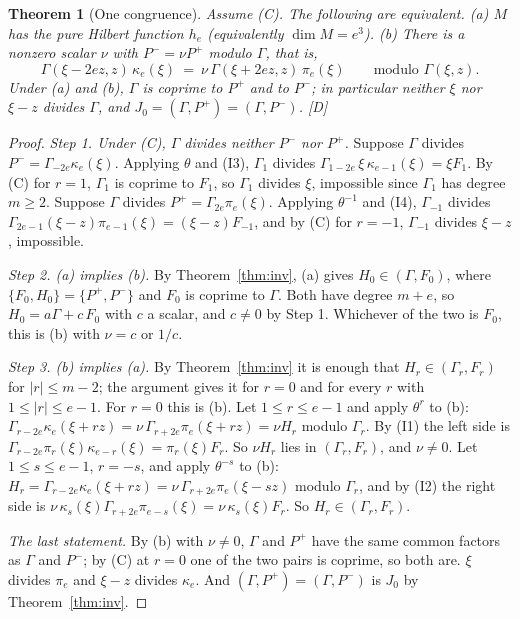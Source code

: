 \documentclass[11pt]{article}
\newtheorem{thmletter}{Theorem}
\theoremstyle{definition}
\theoremstyle{remark}
\begin{document}
\begin{thmletter}[One congruence]\label{thm:cong}
Assume (C). The following are equivalent. (a) $M$ has the pure Hilbert function $h_e$ (equivalently $\dim M=e^3$). (b) There is a nonzero scalar $\nu$ with $P^-=\nu P^+$ modulo $\Gamma$, that is,
\begin{equation}\label{eq:cong}
\Gamma(\xi-2ez,z)\,\kappa_e(\xi)\ =\ \nu\,\Gamma(\xi+2ez,z)\,\pi_e(\xi)\qquad\text{modulo }\Gamma(\xi,z).
\end{equation}
Under (a) and (b), $\Gamma$ is coprime to $P^+$ and to $P^-$; in particular neither $\xi$ nor $\xi-z$ divides $\Gamma$, and $J_0=(\Gamma,P^+)=(\Gamma,P^-)$. [D]
\end{thmletter}
\begin{proof}
\emph{Step 1. Under (C), $\Gamma$ divides neither $P^-$ nor $P^+$.} Suppose $\Gamma$ divides $P^-=\Gamma_{-2e}\kappa_e(\xi)$. Applying $\theta$ and (I3), $\Gamma_1$ divides $\Gamma_{1-2e}\,\xi\,\kappa_{e-1}(\xi)=\xi F_1$. By (C) for $r=1$, $\Gamma_1$ is coprime to $F_1$, so $\Gamma_1$ divides $\xi$, impossible since $\Gamma_1$ has degree $m\ge2$. Suppose $\Gamma$ divides $P^+=\Gamma_{2e}\pi_e(\xi)$. Applying $\theta^{-1}$ and (I4), $\Gamma_{-1}$ divides $\Gamma_{2e-1}(\xi-z)\pi_{e-1}(\xi)=(\xi-z)F_{-1}$, and by (C) for $r=-1$, $\Gamma_{-1}$ divides $\xi-z$, impossible.

\emph{Step 2. (a) implies (b).} By Theorem~\ref{thm:inv}, (a) gives $H_0\in(\Gamma,F_0)$, where $\{F_0,H_0\}=\{P^+,P^-\}$ and $F_0$ is coprime to $\Gamma$. Both have degree $m+e$, so $H_0=a\Gamma+c\,F_0$ with $c$ a scalar, and $c\ne0$ by Step 1. Whichever of the two is $F_0$, this is (b) with $\nu=c$ or $1/c$.

\emph{Step 3. (b) implies (a).} By Theorem~\ref{thm:inv} it is enough that $H_r\in(\Gamma_r,F_r)$ for $|r|\le m-2$; the argument gives it for $r=0$ and for every $r$ with $1\le|r|\le e-1$. For $r=0$ this is (b). Let $1\le r\le e-1$ and apply $\theta^r$ to (b): $\Gamma_{r-2e}\kappa_e(\xi+rz)=\nu\,\Gamma_{r+2e}\pi_e(\xi+rz)=\nu H_r$ modulo $\Gamma_r$. By (I1) the left side is $\Gamma_{r-2e}\pi_r(\xi)\kappa_{e-r}(\xi)=\pi_r(\xi)F_r$. So $\nu H_r$ lies in $(\Gamma_r,F_r)$, and $\nu\ne0$. Let $1\le s\le e-1$, $r=-s$, and apply $\theta^{-s}$ to (b): $H_r=\Gamma_{r-2e}\kappa_e(\xi+rz)=\nu\,\Gamma_{r+2e}\pi_e(\xi-sz)$ modulo $\Gamma_r$, and by (I2) the right side is $\nu\,\kappa_s(\xi)\Gamma_{r+2e}\pi_{e-s}(\xi)=\nu\,\kappa_s(\xi)F_r$. So $H_r\in(\Gamma_r,F_r)$.

\emph{The last statement.} By (b) with $\nu\ne0$, $\Gamma$ and $P^+$ have the same common factors as $\Gamma$ and $P^-$; by (C) at $r=0$ one of the two pairs is coprime, so both are. $\xi$ divides $\pi_e$ and $\xi-z$ divides $\kappa_e$. And $(\Gamma,P^+)=(\Gamma,P^-)$ is $J_0$ by Theorem~\ref{thm:inv}.
\end{proof}
\end{document}
